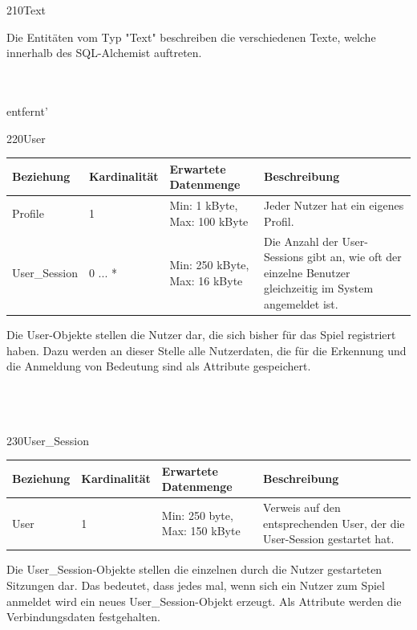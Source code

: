 \begin{entity}{210}{Text}

Die Entitäten vom Typ "Text" beschreiben die verschiedenen Texte, welche innerhalb des SQL-Alchemist auftreten.\\\\\
\end{entity}

\glqq entfernt\grqq'

\begin{entity}{220}{User}
\begin{center}
	\begin{longtable}{|m{4cm}|m{}|m{}|m{}|}
 	 \hline
 	 \textbf{Beziehung} & \textbf{Kardinalität} &  \textbf{Erwartete Datenmenge} & \textbf{Beschreibung} \\
  	\hline
	  Profile & 1 & Min: 1 kByte, Max: 100 kByte & Jeder Nutzer hat ein eigenes Profil.\\
	  \hline
	  User\_Session & 0 ... * & Min: 250 kByte, Max: 16 kByte & Die Anzahl der User-Sessions gibt an, wie oft der einzelne Benutzer gleichzeitig im System angemeldet ist.\\
	  \hline
	\end{longtable}
\end{center}
Die \glqq User\grqq-Objekte stellen die Nutzer dar, die sich bisher für das Spiel registriert haben. Dazu werden an dieser Stelle alle Nutzerdaten, die für die Erkennung und die Anmeldung von Bedeutung sind als Attribute gespeichert.\\\\\\\
\end{entity}

\begin{entity}{230}{User\_Session}
\begin{center}
	\begin{longtable}{|m{4cm}|m{2,5cm}|m{4,5cm}|m{3,5cm}|}
 	 \hline
 	 \textbf{Beziehung} & \textbf{Kardinalität} &  \textbf{Erwartete Datenmenge} & \textbf{Beschreibung} \\
  	\hline
  	User & 1 & Min: 250 byte, Max: 150 kByte & Verweis auf den entsprechenden User, der die User-Session gestartet hat.\\
	  \hline
	\end{longtable}
\end{center}
Die \glqq User\_Session\grqq-Objekte stellen die einzelnen durch die Nutzer gestarteten Sitzungen dar. Das bedeutet, dass jedes mal, wenn sich ein Nutzer zum Spiel anmeldet wird ein neues \glqq User\_Session\grqq-Objekt erzeugt. Als Attribute werden die Verbindungsdaten festgehalten.
\end{entity}


